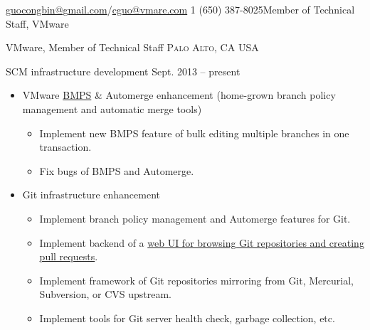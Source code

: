 \documentclass[10pt,letterpaper]{article}
\begin{document}
 



\noindent\href{mailto:guocongbin@gmail.com}{guocongbin@gmail.com}/\href{mailto:cguo@vmware.com}{cguo@vmare.com}\bull
\textsmaller{+}1 (650) 387-8025\bull Member of Technical Staff, VMware

\spacedhrule{0.9em}{-0.4em} %



\headedsection
{VMware, Member of Technical Staff}
{\textsc{Palo Alto, CA USA}} {
\headedsubsection 
{SCM infrastructure development} {Sept. 2013 -- present}
{
    \begin{itemize}
        \item VMware \href{http://bmps.eng.vmware.com}{BMPS} \& Automerge
            enhancement (home-grown branch policy management and automatic
            merge tools)
            \begin{itemize}
                \item Implement new BMPS feature of bulk editing multiple
                    branches in one transaction.
                \item Fix bugs of BMPS and Automerge.
            \end{itemize}
        \item Git infrastructure enhancement
            \begin{itemize}
                \item Implement branch policy management and Automerge features
                    for Git.
                \item Implement backend of a 
                    \href{http://git.eng.vmware.com}{web UI for browsing Git
                    repositories and creating pull requests}.
                \item Implement framework of Git repositories mirroring from
                    Git, Mercurial, Subversion, or CVS upstream.
                \item Implement tools for Git server health check, garbage
                    collection, etc.
            \end{itemize}

    \end{itemize}
}
}
\end{document}
